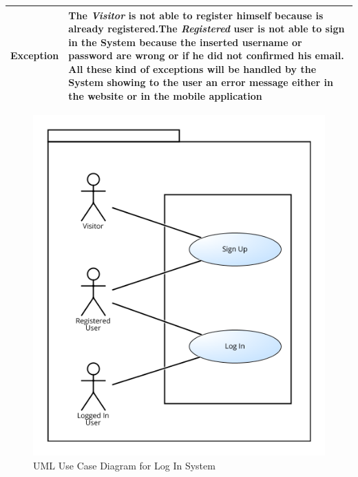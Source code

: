 \begin{table}[H]
\begin{tabular}{|p{3.5cm}|p{10.3cm}|}
    \hline
    \textbf{\large{Exception}} 			& The \emph{Visitor} is not able to register himself because is already registered.\newline The \emph{Registered} user                                         is not able to sign in the System because the inserted username or password are wrong or if he did not confirmed                                           his email. \newline
    										All these kind of exceptions will be handled by the System showing to the user an error message either in the website or in the mobile application \\
    
    \hline
    
    
    \end{tabular}
	
\end{table}

\begin{figure}[H]
\centering
\includegraphics[scale=0.5]{Pictures/UseCaseDiagram/Log_In_System.png}
\caption{UML Use Case Diagram for Log In System}
\end{figure}

